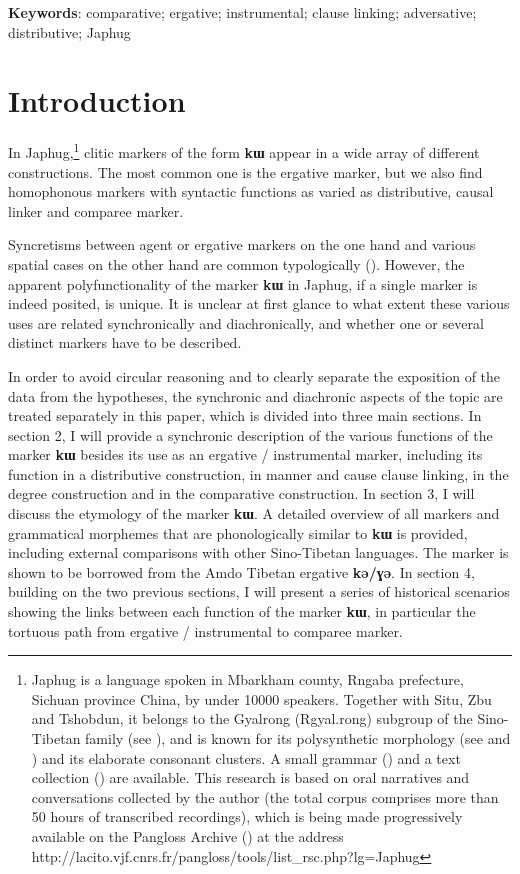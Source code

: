 \documentclass[oldfontcommands,oneside,a4paper,11pt]{article}
\newcommand{\ipa}[1]{{\phon\textbf{#1}}}
\begin{document}
\textbf{Keywords}: comparative; ergative; instrumental; clause linking; adversative; distributive; Japhug
  
\section{Introduction}
  
 
 
In Japhug,\footnote{Japhug is a language spoken in Mbarkham county, Rngaba prefecture, Sichuan province China, by under 10000 speakers. Together with Situ, Zbu and Tshobdun, it belongs to the Gyalrong (Rgyal.rong) subgroup of the Sino-Tibetan family (see \citealt{jackson00sidaba}), and is known for its polysynthetic morphology (see \citealt{jacques13harmonization} and  \citealt{jacques14antipassive}) and its elaborate consonant clusters. A small grammar  (\citealt{jacques08zh}) and a text collection (\citealt{jacques10gesar}) are available.  This research is based on oral narratives and conversations collected by the author (the total corpus comprises more than 50 hours of transcribed recordings), which is being made progressively available on the Pangloss Archive (\citealt{michailovsky14pangloss}) at the address http://lacito.vjf.cnrs.fr/pangloss/tools/list\_rsc.php?lg=Japhug } clitic markers of the form \ipa{kɯ} appear in a wide array of different constructions. The most common one is the ergative marker, but we also find homophonous markers with syntactic functions as varied as distributive, causal linker  and  comparee marker. 

Syncretisms between agent or ergative markers  on the one hand and various spatial cases on the other hand are common typologically (\citealt{agent02palancar}). However, the apparent polyfunctionality of the marker \ipa{kɯ} in Japhug, if a single marker is indeed posited, is unique. It is unclear at first glance to what extent these various uses are related synchronically and diachronically, and whether one or several distinct markers have to be described. 
 
 In order to avoid circular reasoning and to clearly  separate the exposition of the data from the hypotheses, the synchronic and diachronic aspects of the topic are treated separately in this paper, which is divided into three main sections. In section 2, I will provide a synchronic description of the various functions of the marker \ipa{kɯ} besides its use as an ergative / instrumental marker, including its function in a distributive construction, in manner and cause clause linking, in the degree construction and in the comparative construction.  In section 3, I will discuss the etymology of the marker \ipa{kɯ}. A detailed overview of all markers and grammatical morphemes that are phonologically similar to \ipa{kɯ} is provided, including external comparisons with other Sino-Tibetan languages.  The marker is shown to be borrowed from the Amdo Tibetan ergative \ipa{kə/ɣə}. In section 4, building on the two previous sections, I will present a series of historical scenarios showing the links between each function of the marker \ipa{kɯ}, in particular the tortuous path from ergative / instrumental to comparee marker.
\end{document}
